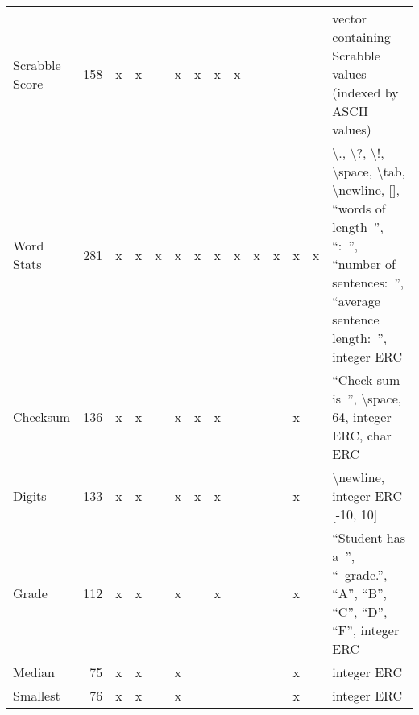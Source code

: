 \documentclass{sig-alternate}
\begin{document}
\begin{table*}
\begin{tabular}{>{\raggedright}p{3.1cm}rccccccccccc>{\raggedright}p{5.5cm}}
Scrabble Score             & 158             & x    & x       &       & x       & x    & x      & x                  &                  &                   &       &            & vector containing Scrabble values (indexed by ASCII values)                                                                                                                                                                 \tabularnewline
Word Stats                 & 281             & x    & x       & x     & x       & x    & x      & x                  & x                & x                 & x     & x          & \textbackslash ., \textbackslash ?, \textbackslash !, \textbackslash space, \textbackslash tab, \textbackslash newline, {[}{]}, ``words of length~'', ``:~'', ``number of sentences:~'', ``average sentence length:~'', integer ERC \tabularnewline
Checksum                   & 136             & x    & x       &       & x       & x    & x      &                    &                  &                   & x     &            & ``Check sum is~'', \textbackslash space, 64, integer ERC, char ERC                                                                                                                                                            \tabularnewline
Digits                     & 133             & x    & x       &       & x       & x    & x      &                    &                  &                   & x     &            & \textbackslash newline, integer ERC {[}-10, 10{]}                                                                                                                                                                           \tabularnewline
Grade                      & 112             & x    & x       &       & x       &      & x      &                    &                  &                   & x     &            & ``Student has a~'', ``~grade.'', ``A'', ``B'', ``C'', ``D'', ``F'', integer ERC                                                                                                                                                           \tabularnewline
Median                     & 75              & x    & x       &       & x       &      &        &                    &                  &                   & x     &            & integer ERC                                                                                                                                                                                                                 \tabularnewline
Smallest                   & 76              & x    & x       &       & x       &      &        &                    &                  &                   & x     &            & integer ERC                                                                                                                                                                                                                 \tabularnewline

\end{tabular}
\end{table*}
\end{document}
